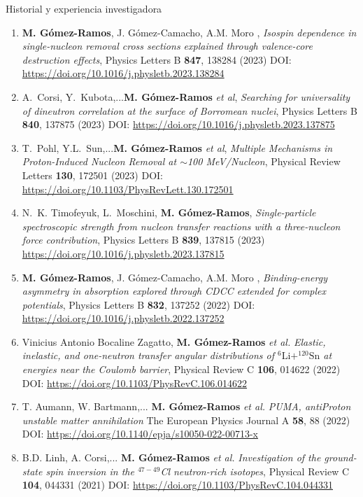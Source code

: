 \documentclass{resume2} %
\begin{document}
\begin{rSection}{Historial y experiencia investigadora}
\begin{enumerate}[label=\alph*.]
\begin{enumerate}[label=\arabic*.]
\item {\bf M. G\'omez-Ramos}, J. G\'omez-Camacho, A.M. Moro , {\it Isospin dependence in single-nucleon removal cross sections explained through valence-core destruction effects}, Physics Letters B {\bf 847}, 138284 (2023) DOI: \url{https://doi.org/10.1016/j.physletb.2023.138284}

\item A.~Corsi, Y.~Kubota,...{\bf M. G\'omez-Ramos} {\it et al}, {\it Searching for universality of dineutron correlation at the surface of Borromean nuclei}, Physics Letters B {\bf 840}, 137875 (2023) DOI: \url{https://doi.org/10.1016/j.physletb.2023.137875}

\item T.~Pohl, Y.L.~Sun,...{\bf M. G\'omez-Ramos} {\it et al}, {\it Multiple Mechanisms in Proton-Induced Nucleon Removal at $\sim$100 MeV/Nucleon}, Physical Review Letters {\bf 130}, 172501 (2023) DOI: \url{https://doi.org/10.1103/PhysRevLett.130.172501}

\item N.~K. Timofeyuk, L.~Moschini, {\bf M. G\'omez-Ramos}, {\it Single-particle spectroscopic strength from nucleon transfer reactions with a three-nucleon force contribution}, Physics Letters B {\bf 839}, 137815 (2023) \url{https://doi.org/10.1016/j.physletb.2023.137815}

\item {\bf M. G\'omez-Ramos}, J. G\'omez-Camacho, A.M. Moro , {\it Binding-energy asymmetry in absorption explored through CDCC extended for complex potentials}, Physics Letters B {\bf 832}, 137252 (2022) DOI: \url{https://doi.org/10.1016/j.physletb.2022.137252}

\item Vinicius Antonio Bocaline Zagatto, {\bf M. G\'omez-Ramos} \textit{et al.} {\it Elastic, inelastic, and one-neutron transfer angular distributions of $^6\mathrm{Li}+^{120}\mathrm{Sn}$ at energies near the Coulomb barrier}, Physical Review C \textbf{106}, 014622 (2022) DOI: \url{https://doi.org/10.1103/PhysRevC.106.014622}

\item T. Aumann, W. Bartmann,... {\bf M. G\'omez-Ramos} \textit{et al.} {\it PUMA, antiProton unstable matter annihilation} 
The European Physics Journal A \textbf{58}, 88 (2022) DOI: \url{https://doi.org/10.1140/epja/s10050-022-00713-x}

\item B.D. Linh, A. Corsi,... {\bf M. G\'omez-Ramos} \textit{et al.} {\it Investigation of the ground-state spin inversion in the $^{47-49}$Cl neutron-rich  isotopes}, Physical Review C \textbf{104}, 044331 (2021) DOI: \url{https://doi.org/10.1103/PhysRevC.104.044331}


\end{enumerate}
\end{enumerate}
\end{rSection}
\end{document}
